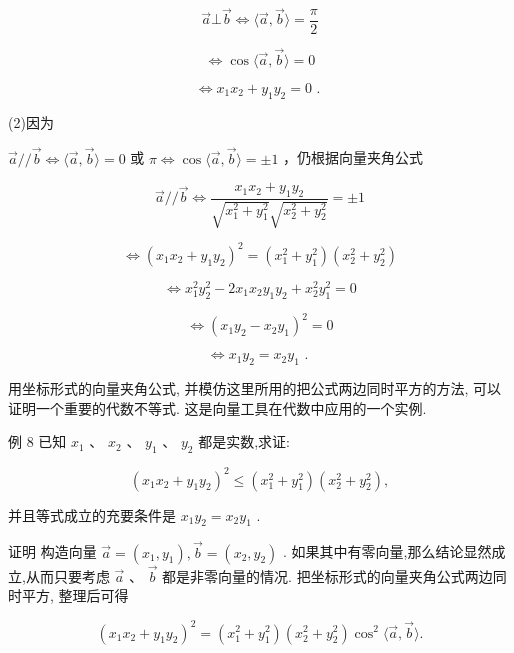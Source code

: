 \documentclass[10pt]{article}
\begin{document}
\[
\overrightarrow{a} \bot  \overrightarrow{b} \Leftrightarrow  \langle \overrightarrow{a},\overrightarrow{b}\rangle  = \frac{\pi }{2}
\]

\[
\Leftrightarrow  \cos \langle \overrightarrow{a},\overrightarrow{b}\rangle  = 0
\]

\[
\Leftrightarrow  {x}_{1}{x}_{2} + {y}_{1}{y}_{2} = 0\text{ . }
\]

(2)因为

\(\overrightarrow{a}//\overrightarrow{b} \Leftrightarrow  \langle \overrightarrow{a},\overrightarrow{b}\rangle  = 0\) 或 \(\pi  \Leftrightarrow  \cos \langle \overrightarrow{a},\overrightarrow{b}\rangle  =  \pm  1\) ，仍根据向量夹角公式

\[
\overrightarrow{a}//\overrightarrow{b} \Leftrightarrow  \frac{{x}_{1}{x}_{2} + {y}_{1}{y}_{2}}{\sqrt{{x}_{1}^{2} + {y}_{1}^{2}}\sqrt{{x}_{2}^{2} + {y}_{2}^{2}}} =  \pm  1
\]

\[
\Leftrightarrow  {\left( {x}_{1}{x}_{2} + {y}_{1}{y}_{2}\right) }^{2} = \left( {{x}_{1}^{2} + {y}_{1}^{2}}\right) \left( {{x}_{2}^{2} + {y}_{2}^{2}}\right)
\]

\[
\Leftrightarrow  {x}_{1}^{2}{y}_{2}^{2} - 2{x}_{1}{x}_{2}{y}_{1}{y}_{2} + {x}_{2}^{2}{y}_{1}^{2} = 0
\]

\[
\Leftrightarrow  {\left( {x}_{1}{y}_{2} - {x}_{2}{y}_{1}\right) }^{2} = 0
\]

\[
\Leftrightarrow  {x}_{1}{y}_{2} = {x}_{2}{y}_{1}\text{ . }
\]

用坐标形式的向量夹角公式, 并模仿这里所用的把公式两边同时平方的方法, 可以证明一个重要的代数不等式. 这是向量工具在代数中应用的一个实例.

例 8 已知 \({x}_{1}\text{ 、 }{x}_{2}\text{ 、 }{y}_{1}\text{ 、 }{y}_{2}\) 都是实数,求证:

\[
{\left( {x}_{1}{x}_{2} + {y}_{1}{y}_{2}\right) }^{2} \leq  \left( {{x}_{1}^{2} + {y}_{1}^{2}}\right) \left( {{x}_{2}^{2} + {y}_{2}^{2}}\right) ,
\]

并且等式成立的充要条件是 \({x}_{1}{y}_{2} = {x}_{2}{y}_{1}\) .

证明 构造向量 \(\overrightarrow{a} = \left( {{x}_{1},{y}_{1}}\right) ,\overrightarrow{b} = \left( {{x}_{2},{y}_{2}}\right)\) . 如果其中有零向量,那么结论显然成立,从而只要考虑 \(\overrightarrow{a}\text{ 、 }\overrightarrow{b}\) 都是非零向量的情况. 把坐标形式的向量夹角公式两边同时平方, 整理后可得

\[
{\left( {x}_{1}{x}_{2} + {y}_{1}{y}_{2}\right) }^{2} = \left( {{x}_{1}^{2} + {y}_{1}^{2}}\right) \left( {{x}_{2}^{2} + {y}_{2}^{2}}\right) {\cos }^{2}\langle \overrightarrow{a},\overrightarrow{b}\rangle .
\]
\end{document}

